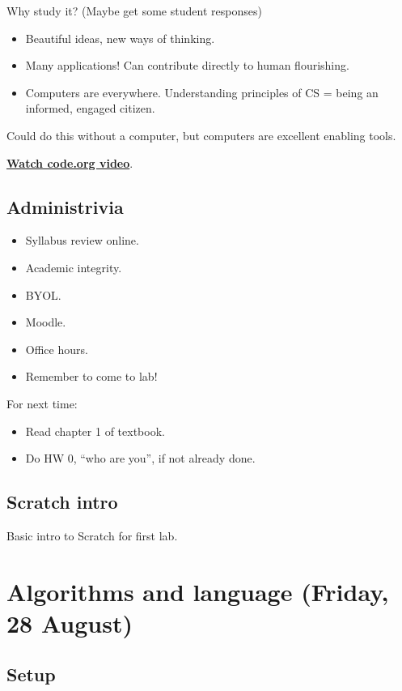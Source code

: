 \documentclass{article}
\begin{document}
Why study it?  (Maybe get some student responses)
\begin{itemize}
\item Beautiful ideas, new ways of thinking.
\item Many applications!  Can contribute directly to human flourishing.
\item Computers are everywhere.  Understanding principles of CS =
  being an informed, engaged citizen.
\end{itemize}
Could do this without a computer, but computers are excellent enabling
tools.

\href{https://www.youtube.com/watch?v=qYZF6oIZtfc}{\textbf{Watch code.org video}}.

\subsection*{Administrivia}

\begin{itemize}
\item Syllabus review online.
\item Academic integrity.
\item BYOL.
\item Moodle.
\item Office hours.
\item Remember to come to lab!
\end{itemize}

For next time:

\begin{itemize}
\item Read chapter 1 of textbook.
\item Do HW 0, ``who are you'', if not already done.
\end{itemize}

\subsection*{Scratch intro}

Basic intro to Scratch for first lab.

\newpage

\section{Algorithms and language (Friday, 28 August)}

\subsection*{Setup}
\end{document}

